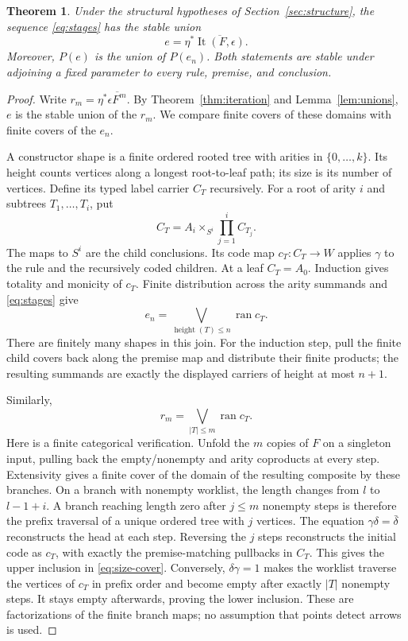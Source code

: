 \documentclass[11pt]{article}
\newtheorem{theorem}{Theorem}[section]
\theoremstyle{definition}\newtheorem{definition}[theorem]{Definition}
\theoremstyle{remark}\newtheorem{remark}[theorem]{Remark}
\newcommand{\ran}{\operatorname{ran}}
\newcommand{\It}{\operatorname{It}}
\begin{document}
\begin{theorem}\label{thm:stages}
Under the structural hypotheses of Section~\ref{sec:structure},
the sequence \eqref{eq:stages} has the stable union
\[
 e=\eta^*\overline{\It(F,\epsilon)}.
\]
Moreover, $P(e)$ is the union of $P(e_n)$. Both statements are
stable under adjoining a fixed parameter to every rule, premise,
and conclusion.
\end{theorem}
\begin{proof}
Write $r_m=\eta^*\overline{\epsilon F^m}$. By
Theorem~\ref{thm:iteration} and Lemma~\ref{lem:unions}, $e$ is
the stable union of the $r_m$. We compare finite covers of these
domains with finite covers of the $e_n$.

A constructor shape is a finite ordered rooted tree with arities in
$\{0,\ldots,k\}$. Its height counts vertices along a longest
root-to-leaf path; its size is its number of vertices. Define its
typed label carrier $C_T$ recursively. For a root of arity $i$
and subtrees $T_1,\ldots,T_i$, put
\[
 C_T=A_i\times_{S^i}\prod_{j=1}^i C_{T_j}.
\]
The maps to $S^i$ are the child conclusions. Its code map
$c_T:C_T\to W$ applies $\gamma$ to the rule and the recursively
coded children. At a leaf $C_T=A_0$. Induction gives totality
and monicity of $c_T$. Finite distribution across the arity
summands and \eqref{eq:stages} give
\begin{equation}\label{eq:height-cover}
 e_n=\bigvee_{\operatorname{height}(T)\le n}\ran c_T.
\end{equation}
There are finitely many shapes in this join. For the induction step,
pull the finite child covers back along the premise map and
distribute their finite products; the resulting summands are exactly
the displayed carriers of height at most $n+1$.

Similarly,
\begin{equation}\label{eq:size-cover}
 r_m=\bigvee_{|T|\le m}\ran c_T.
\end{equation}
Here is a finite categorical verification. Unfold the $m$ copies of
$F$ on a singleton input, pulling back the empty/nonempty and arity
coproducts at every step. Extensivity gives a finite cover of the
domain of the resulting composite by these branches. On a branch
with nonempty worklist, the length changes from $l$ to $l-1+i$.
A branch reaching length zero after $j\le m$ nonempty steps is
therefore the prefix traversal of a unique ordered tree with $j$
vertices. The equation $\gamma\delta=\bar\delta$ reconstructs
the head at each step. Reversing the $j$ steps reconstructs the
initial code as $c_T$, with exactly the premise-matching pullbacks
in $C_T$. This gives the upper inclusion in \eqref{eq:size-cover}.
Conversely, $\delta\gamma=1$ makes the worklist traverse the
vertices of $c_T$ in prefix order and become empty after exactly
$|T|$ nonempty steps. It stays empty afterwards, proving the lower
inclusion. These are factorizations of the finite branch maps;
no assumption that points detect arrows is used.


\end{proof}
\end{document}
